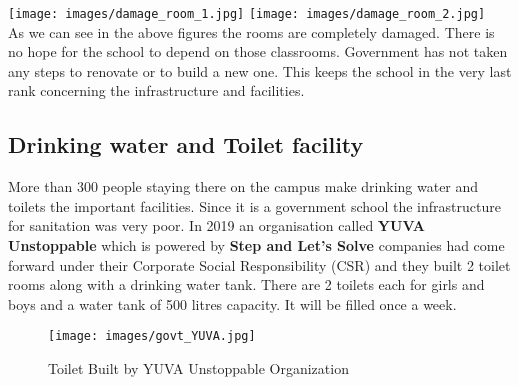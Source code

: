 \texttt{[image: images/damage\_room\_1.jpg]}
 \texttt{[image: images/damage\_room\_2.jpg]} \\

As we can see in the above figures the rooms are completely damaged. There is no hope for the school to depend on those classrooms. Government has not taken any steps to renovate or to build a new one. This keeps the school in the very last rank concerning the infrastructure and facilities. 

\subsection{Drinking water and Toilet facility}
More than 300 people staying there on the campus make drinking water and toilets the important facilities. Since it is a government school the infrastructure for sanitation was very poor. In 2019 an organisation called \textbf{YUVA Unstoppable} which is powered by \textbf{Step and Let's Solve} companies had come forward under their Corporate Social Responsibility (CSR) and they built 2 toilet rooms along with a drinking water tank. There are 2 toilets each for girls and boys and a water tank of 500 litres capacity. It will be filled once a week.

\begin{figure}[H]
    \centering
    \texttt{[image: images/govt\_YUVA.jpg]}
    \caption{Toilet Built by YUVA Unstoppable Organization }
\end{figure}

